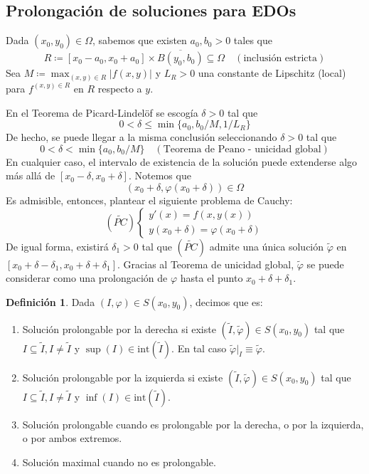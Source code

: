 \documentclass[11pt]{article}
\theoremstyle{definition} %
\newtheorem{definition}[theorem]{Definición}
\begin{document}
\subsection{Prolongación de soluciones para EDOs}

Dada $(x_0, y_0) \in \Omega$, sabemos que existen $a_0, b_0 > 0$ tales que
\[ R \coloneqq [x_0 - a_0, x_0 + a_0] \times \overline{B(y_0, b_0)} \subseteq \Omega \quad (\text{inclusión estricta}) \]
Sea $M \coloneqq \max_{(x,y) \in R} |f(x,y)|$ y $L_{R} > 0$ una constante de Lipschitz (local) para $f^{(x,y)\in R}$ en $R$ respecto a $y$.

En el Teorema de Picard-Lindelöf se escogía $\delta > 0$ tal que
\[  0 < \delta \leq \min\{a_0, b_0/M, 1/L_{R}\} \]
De hecho, se puede llegar a la misma conclusión seleccionando $\delta > 0$ tal que
\[ 0 < \delta < \min\{a_0, b_0/M\} \quad (\text{Teorema de Peano - unicidad global}) \]
En cualquier caso, el intervalo de existencia de la solución puede extenderse algo más allá de $[x_0 - \delta, x_0 + \delta]$. Notemos que
\[ (x_0 + \delta, \varphi(x_0 + \delta)) \in \Omega \]
Es admisible, entonces, plantear el siguiente problema de Cauchy:
\[ (\tilde{PC}) \begin{cases} y'(x) = f(x, y(x)) \\ y(x_0 + \delta) = \varphi(x_0 + \delta) \end{cases} \]
De igual forma, existirá $\delta_1 > 0$ tal que $(\tilde{PC})$ admite una única solución $\tilde{\varphi}$ en $[x_0 + \delta - \delta_1, x_0 + \delta + \delta_1]$. Gracias al Teorema de unicidad global, $\tilde{\varphi}$ se puede considerar como una prolongación de $\varphi$ hasta el punto $x_0 + \delta + \delta_1$.

\begin{definition}
  Dada $(I, \varphi) \in S(x_0, y_0)$, decimos que es:
  \begin{enumerate}
    \item Solución prolongable por la derecha si existe $(\tilde{I}, \tilde{\varphi}) \in S(x_0, y_0)$ tal que $I \subseteq \tilde{I}, I \neq \tilde{I}$ y $\sup(I) \in \text{int}(\tilde{I})$. En tal caso $\tilde{\varphi}|_{I} \equiv \tilde{\varphi}$.

    \item Solución prolongable por la izquierda si existe $(\tilde{I}, \tilde{\varphi}) \in S(x_0, y_0)$ tal que $I \subseteq \tilde{I}, I \neq \tilde{I}$ y $\inf(I) \in \text{int}(\tilde{I})$.

    \item Solución prolongable cuando es prolongable por la derecha, o por la izquierda, o por ambos extremos.

    \item Solución maximal cuando no es prolongable.
  \end{enumerate}
\end{definition}
\end{document}
